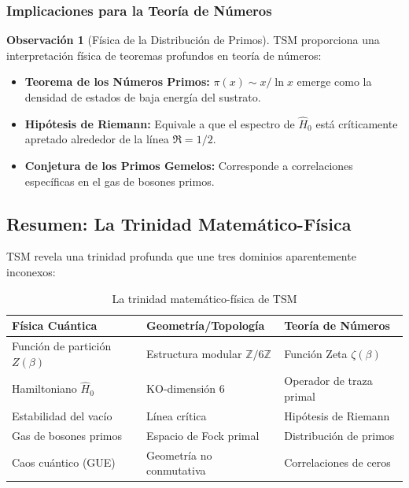 \documentclass[11pt, a4paper]{article}
\theoremstyle{plain}
\theoremstyle{definition}
\newtheorem{observacion}[teorema]{Observación}
\newcommand{\Zmod}{\mathbb{Z}/6\mathbb{Z}}
\begin{document}
\subsubsection{Implicaciones para la Teoría de Números}

\begin{observacion}[Física de la Distribución de Primos]
TSM proporciona una interpretación física de teoremas profundos en teoría de números:
\begin{itemize}
    \item \textbf{Teorema de los Números Primos:} $\pi(x) \sim x/\ln x$ emerge como la densidad de estados de baja energía del sustrato.
    
    \item \textbf{Hipótesis de Riemann:} Equivale a que el espectro de $\hat{H}_0$ está críticamente apretado alrededor de la línea $\Re = 1/2$.
    
    \item \textbf{Conjetura de los Primos Gemelos:} Corresponde a correlaciones específicas en el gas de bosones primos.
\end{itemize}
\end{observacion}

\subsection{Resumen: La Trinidad Matemático-Física}

TSM revela una trinidad profunda que une tres dominios aparentemente inconexos:

\begin{table}[H]
\centering
\caption{La trinidad matemático-física de TSM}
\label{tab:trinidad}
\begin{tabular}{lll}
\toprule
\textbf{Física Cuántica} & \textbf{Geometría/Topología} & \textbf{Teoría de Números} \\
\midrule
Función de partición $Z(\beta)$ & Estructura modular $\Zmod$ & Función Zeta $\zeta(\beta)$ \\
Hamiltoniano $\hat{H}_0$ & KO-dimensión 6 & Operador de traza primal \\
Estabilidad del vacío & Línea crítica & Hipótesis de Riemann \\
Gas de bosones primos & Espacio de Fock primal & Distribución de primos \\
Caos cuántico (GUE) & Geometría no conmutativa & Correlaciones de ceros \\
\bottomrule
\end{tabular}
\end{table}
\end{document}
